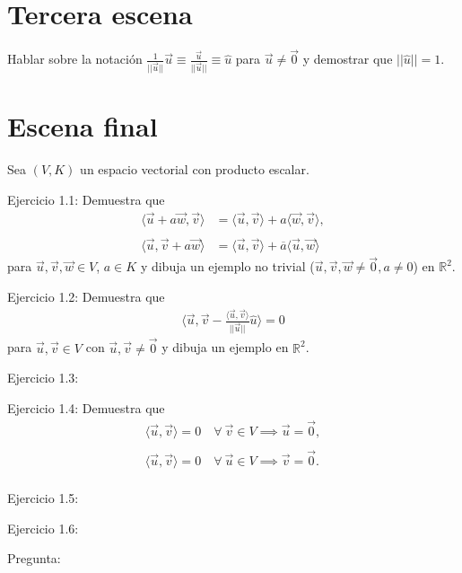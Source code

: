 \documentclass[12pt,dvipsnames]{article}
\numberwithin{equation}{section}
\begin{document}

\newpage
\section{Tercera escena}
Hablar sobre la notación $\frac{1}{||\vec{u}||}\vec{u}\equiv \frac{\vec{u}}{||\vec{u}||}\equiv \hat{u}$ para $\vec{u}\neq\vec{0}$ y demostrar que $||\hat{u}|| = 1$.


\newpage
\section{Escena final}

\begin{center}
    Sea $(V,K)$ un espacio vectorial con producto escalar.
\end{center}

Ejercicio 1.1: Demuestra que
\begin{align*}
    \langle \vec{u} + a\vec{w}, \vec{v}\rangle &= \langle \vec{u},\vec{v}\rangle + a\langle \vec{w}, \vec{v}\rangle, \\
    \\
    \langle \vec{u}, \vec{v} + a\vec{w}\rangle &= \langle \vec{u},\vec{v}\rangle + \overline{a}\langle \vec{u}, \vec{w}\rangle
\end{align*} para $\vec{u},\vec{v},\vec{w}\in V$, $a\in K$ y dibuja un ejemplo no trivial ($\vec{u},\vec{v},\vec{w}\neq\vec{0}, a\neq 0$) en $\mathbb{R}^2$.

\hspace{5mm}

Ejercicio 1.2: Demuestra que
\begin{align*}
    \bigg\langle \vec{u}, \vec{v} - \frac{\langle \vec{u}, \vec{v}\rangle}{||\vec{u}||}\hat{u} \bigg\rangle = 0
\end{align*} para $\vec{u},\vec{v}\in V$ con $\vec{u},\vec{v}\neq\vec{0}$ y dibuja un ejemplo en $\mathbb{R}^2$.

\vspace{5mm}

Ejercicio 1.3: 

\vspace{5mm}

Ejercicio 1.4: Demuestra que
\begin{align*}
    \langle \vec{u}, \vec{v} \rangle = 0 \quad \forall \  \vec{v}\in V \implies \vec{u}=\vec{0}, \\
    \\
    \langle \vec{u}, \vec{v} \rangle = 0 \quad \forall \  \vec{u}\in V \implies \vec{v}=\vec{0}. \\
\end{align*}

\vspace{5mm}

Ejercicio 1.5:

\vspace{5mm}

Ejercicio 1.6:

\vspace{5mm}

Pregunta:
\end{document}
